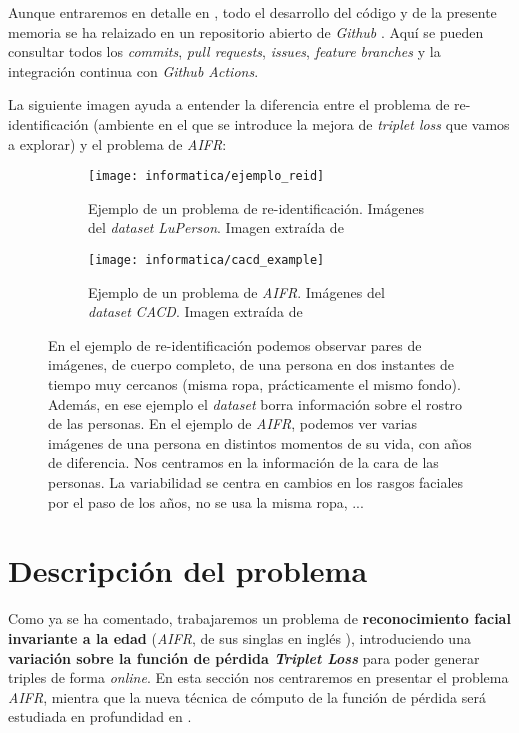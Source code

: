 Aunque entraremos en detalle en , todo el desarrollo del código y de la presente memoria se ha relaizado en un repositorio abierto de \textit{Github} \cite{informatica:repogithub}. Aquí se pueden consultar todos los \textit{commits}, \textit{pull requests}, \textit{issues}, \textit{feature branches} y la integración continua con \textit{Github Actions}.

La siguiente imagen ayuda a entender la diferencia entre el problema de re-identificación (ambiente en el que se introduce la mejora de \textit{triplet loss} que vamos a explorar) y el problema de \textit{AIFR}:

\begin{figure}[H]
    \centering
    \ajustarsubcaptions
    \begin{subfigure}{0.4\textwidth}
        \texttt{[image: informatica/ejemplo\_reid]}
        \caption{Ejemplo de un problema de re-identificación. Imágenes del \textit{dataset} \textit{LuPerson}. Imagen extraída de \cite{informatica:luperson}}
    \end{subfigure}%
    \begin{subfigure}{0.6\textwidth}
        \texttt{[image: informatica/cacd\_example]}
        \caption{Ejemplo de un problema de \textit{AIFR}. Imágenes del \textit{dataset} \textit{CACD}. Imagen extraída de \cite{informatica:paper_cacd}}
    \end{subfigure}

    \caption{En el ejemplo de re-identificación podemos observar pares de imágenes, de cuerpo completo, de una persona en dos instantes de tiempo muy cercanos (misma ropa, prácticamente el mismo fondo). Además, en ese ejemplo el \textit{dataset} borra información sobre el rostro de las personas. En el ejemplo de \textit{AIFR}, podemos ver varias imágenes de una persona en distintos momentos de su vida, con años de diferencia. Nos centramos en la información de la cara de las personas. La variabilidad se centra en cambios en los rasgos faciales por el paso de los años, no se usa la misma ropa, ...}
\end{figure}

\section{Descripción del problema} \label{ich:descrp_problema}

Como ya se ha comentado, trabajaremos un problema de \textbf{reconocimiento facial invariante a la edad} (\textit{AIFR}, de sus singlas en inglés ), introduciendo una \textbf{variación sobre la función de pérdida \textit{Triplet Loss}} para poder generar triples de forma \textit{online}. En esta sección nos centraremos en presentar el problema \textit{AIFR}, mientra que la nueva técnica de cómputo de la función de pérdida será estudiada en profundidad en .

